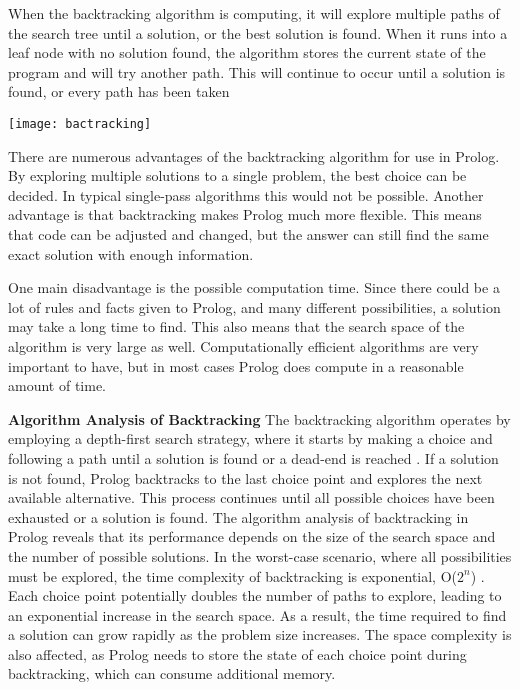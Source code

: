 \documentclass{article}
\theoremstyle{theorem}
\theoremstyle{definition}
\theoremstyle{remark}
\begin{document}
\noindent\newline When the backtracking algorithm is computing, it will explore multiple paths of the search tree until a solution, or the best solution is found. When it runs into a leaf node with no solution found, the algorithm stores the current state of the program and will try another path. This will continue to occur until a solution is found, or every path has been taken \cite{(16)}

\texttt{[image: bactracking]}\noindent\newline

\noindent\newline There are numerous advantages of the backtracking algorithm for use in Prolog. By exploring multiple solutions to a single problem, the best choice can be decided. In typical single-pass algorithms this would not be possible. Another advantage is that backtracking makes Prolog much more flexible. This means that code can be adjusted and changed, but the answer can still find the same exact solution with enough information. 

\noindent\newline One main disadvantage is the possible computation time. Since there could be a lot of rules and facts given to Prolog, and many different possibilities, a solution may take a long time to find. This also means that the search space of the algorithm is very large as well. Computationally efficient algorithms are very important to have, but in most cases Prolog does compute in a reasonable amount of time.

\noindent\newline\newline\textbf{Algorithm Analysis of Backtracking}
\noindent\newline The backtracking algorithm operates by employing a depth-first search strategy, where it starts by making a choice and following a path until a solution is found or a dead-end is reached \cite{(17)}. If a solution is not found, Prolog backtracks to the last choice point and explores the next available alternative. This process continues until all possible choices have been exhausted or a solution is found. The algorithm analysis of backtracking in Prolog reveals that its performance depends on the size of the search space and the number of possible solutions. In the worst-case scenario, where all possibilities must be explored, the time complexity of backtracking is exponential, O($2^n$) \cite{(14)}. Each choice point potentially doubles the number of paths to explore, leading to an exponential increase in the search space. As a result, the time required to find a solution can grow rapidly as the problem size increases. The space complexity is also affected, as Prolog needs to store the state of each choice point during backtracking, which can consume additional memory.
\end{document}
